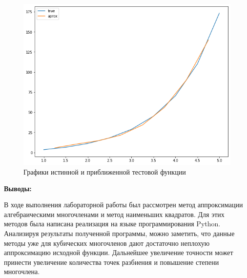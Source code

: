 \documentclass [12pt]{article}
\begin{document}
\begin{figure}[H]
    \includegraphics[width=\linewidth]{test_func2.png}
    \caption{Графики истинной и приближенной тестовой функции}
    \label{fig:graph2}
\end{figure}

\textbf{Выводы:}

В ходе выполнения лабораторной работы был рассмотрен метод аппроксимации алгебраическими многочленами и метод наименьших квадратов. Для этих методов была написана реализация на языке программирования Python. Анализируя результаты полученной программы, можно заметить, что данные методы уже для кубических многочленов дают достаточно неплохую аппроксимацию исходной функции. Дальнейшее увеличение точности может принести увеличение количества точек разбиения и повышение степени многочлена. 
\end{document}
